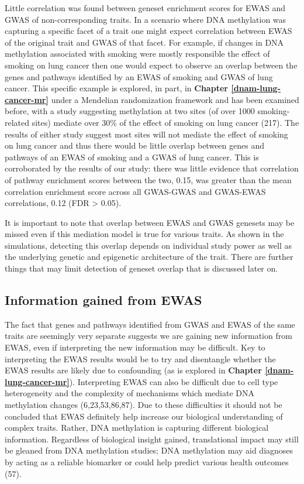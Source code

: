 \documentclass[11pt,twoside]{bristolthesis}
\begin{document}
Little correlation was found between geneset enrichment scores for EWAS and GWAS of non-corresponding traits. In a scenario where DNA methylation was capturing a specific facet of a trait one might expect correlation between EWAS of the original trait and GWAS of that facet. For example, if changes in DNA methylation associated with smoking were mostly responsible the effect of smoking on lung cancer then one would expect to observe an overlap between the genes and pathways identified by an EWAS of smoking and GWAS of lung cancer. This specific example is explored, in part, in \textbf{Chapter \ref{dnam-lung-cancer-mr}} under a Mendelian randomization framework and has been examined before, with a study suggesting methylation at two sites (of over 1000 smoking-related sites) mediate over 30\% of the effect of smoking on lung cancer (217). The results of either study suggest most sites will not mediate the effect of smoking on lung cancer and thus there would be little overlap between genes and pathways of an EWAS of smoking and a GWAS of lung cancer. This is corroborated by the results of our study: there was little evidence that correlation of pathway enrichment scores between the two, 0.15, was greater than the mean correlation enrichment score across all GWAS-GWAS and GWAS-EWAS correlations, 0.12 (FDR \textgreater{} 0.05).

It is important to note that overlap between EWAS and GWAS genesets may be missed even if this mediation model is true for various traits. As shown in the simulations, detecting this overlap depends on individual study power as well as the underlying genetic and epigenetic architecture of the trait. There are further things that may limit detection of geneset overlap that is discussed later on.

\hypertarget{information-gained}{%
\subsection{Information gained from EWAS}\label{information-gained}}

The fact that genes and pathways identified from GWAS and EWAS of the same traits are seemingly very separate suggests we are gaining new information from EWAS, even if interpreting the new information may be difficult. Key to interpreting the EWAS results would be to try and disentangle whether the EWAS results are likely due to confounding (as is explored in \textbf{Chapter \ref{dnam-lung-cancer-mr}}). Interpreting EWAS can also be difficult due to cell type heterogeneity and the complexity of mechanisms which mediate DNA methylation changes (6,23,53,86,87). Due to these difficulties it should not be concluded that EWAS definitely help increase our biological understanding of complex traits. Rather, DNA methylation is capturing different biological information. Regardless of biological insight gained, translational impact may still be gleaned from DNA methylation studies; DNA methylation may aid diagnoses by acting as a reliable biomarker or could help predict various health outcomes (57).
\end{document}

